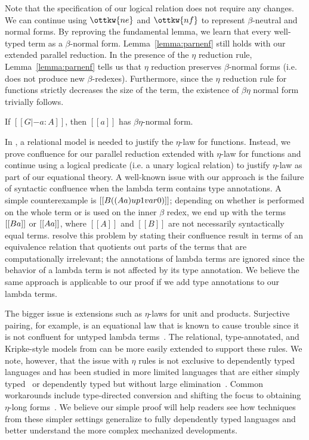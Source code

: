 \documentclass[acmsmall,screen=true,
\ifpublic review=false\else,review=true\fi
  ,anonymous=\ifanonymous true\else false\fi]{acmart}
\begin{document}
Note that the specification of our logical relation does not require
any changes. We can continue using $\ottkw{ne}$ and $\ottkw{nf}$ to
represent $\beta$-neutral and normal forms. By reproving the
fundamental lemma, we learn that every well-typed term as a
$\beta$-normal form. Lemma~\ref{lemma:parnenf} still holds with our
extended parallel reduction. In the presence of the $\eta$ reduction
rule, Lemma~\ref{lemma:parnenf} tells us that $\eta$ reduction
preserves $\beta$-normal forms (i.e. does not produce new
$\beta$-redexes). Furthermore, since the $\eta$ reduction rule for
functions strictly decreases the size of the term, the existence of
$\beta\eta$ normal form trivially follows.
\begin{corollary}
\label{corollary:exbetaeta}
If $[[G |- a : A]]$, then $[[a]]$ has $\beta\eta$-normal form.
\end{corollary}

In \citet{nbeincoq,decagda,martin-lof-a-la-coq}, a relational model is
needed to justify the $\eta$-law for functions. Instead, we prove
confluence for our parallel reduction extended with $\eta$-law for functions
and continue using a logical predicate (i.e. a unary logical relation) to justify
$\eta$-law as part of our equational theory.
A well-known issue with our approach is the failure of syntactic
confluence when the lambda term contains type annotations. A simple
counterexample is $[[\- B ((\- A a) {up 1} var 0)]]$; depending on
whether  is performed on the whole term or
 is used on the inner $\beta$ redex, we end up with the
terms $[[\- B a]]$ or $[[\- A a]]$, where $[[A]]$ and $[[B]]$ are not
necessarily syntactically equal terms. \citet{choudhury:ddc} resolve
this problem by stating their confluence result in terms of an
equivalence relation that quotients out parts of the terms that are
computationally irrelevant; the annotations of lambda terms are
ignored since the behavior of a lambda term is not affected by its
type annotation. We believe the same approach is applicable to our
proof if we add type annotations to our lambda terms.

The bigger issue is extensions such as $\eta$-laws for unit and
products. Surjective pairing, for example, is an equational law that
is known to cause trouble since it is not confluent for untyped lambda
terms~\citet{KLOP198997}. The relational, type-annotated, and Kripke-style models from
\citet{nbeincoq,decagda,martin-lof-a-la-coq} can be more easily
extended to support these rules.
We note, however, that the issue with $\eta$ rules is not exclusive to dependently
typed languages and has been studied in more limited languages that
are either simply
typed~\citep{pierce2004advanced,pfenning1997computation} or
dependently typed but without large
elimination~\citep{harper2005equivalence,
abel2005untypedconvsurjective}. Common workarounds include
type-directed conversion and shifting the focus to obtaining
$\eta$-long forms~\citet{Abel12}.
We believe our simple proof will help readers
see how techniques from these simpler settings generalize to fully
dependently typed languages and better understand the more complex
mechanized developments.
\end{document}
